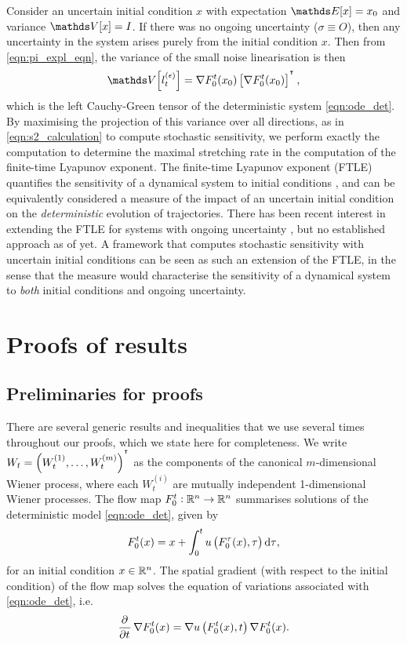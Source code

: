 Consider an uncertain initial condition \(x\) with expectation \(\avg{x} = x_0\) and variance \(\var{x} = I\).
If there was no ongoing uncertainty (\(\sigma \equiv O\)), then any uncertainty in the system arises purely from the initial condition \(x\).
Then from \cref{eqn:pi_expl_eqn}, the variance of the small noise linearisation is then
\[
	\var{l_t^{(\epsilon)}} = \nabla F_0^t\!\left(x_0\right)\left[\nabla F_0^t\!\left(x_0\right)\right]^{\T},
\]
which is the left Cauchy-Green tensor of the deterministic system \cref{eqn:ode_det}.
By maximising the projection of this variance over all directions, as in \cref{eqn:s2_calculation} to compute stochastic sensitivity, we perform exactly the computation to determine the maximal stretching rate in the computation of the finite-time Lyapunov exponent.
The finite-time Lyapunov exponent (FTLE) quantifies the sensitivity of a dynamical system to initial conditions \citep{ShaddenEtAl_2005_DefinitionPropertiesLagrangian}, and can be equivalently considered a measure of the impact of an uncertain initial condition on the \emph{deterministic} evolution of trajectories.
There has been recent interest in extending the FTLE for systems with ongoing uncertainty \citep{Balasuriya_2020_UncertaintyFinitetimeLyapunov,YouLeung_2021_ComputingFiniteTime,GuoEtAl_2016_FiniteTimeLyapunovExponents}, but no established approach as of yet.
A framework that computes stochastic sensitivity with uncertain initial conditions can be seen as such an extension of the FTLE, in the sense that the measure would characterise the sensitivity of a dynamical system to \emph{both} initial conditions and ongoing uncertainty.




\section{Proofs of results}\label{sec:paper_proofs}
\subsection{Preliminaries for proofs}\label{app:gauss}

There are several generic results and inequalities that we use several times throughout our proofs, which we state here for completeness.
We write \(W_t = \left(W_t^{(1)}, \hdots, W_t^{(m)}\right)^{^{\intercal}}\) as the components of the canonical \(m\)-dimensional Wiener process, where each \(W_t^{(i)}\) are mutually independent 1-dimensional Wiener processes.
The flow map \(F_0^t: \mathbb{R}^n \to \mathbb{R}^n\) summarises solutions of the deterministic model \cref{eqn:ode_det}, given by
\begin{equation}
	F_{0}^{t}(x) = x + \int_{0}^{t}{u\left(F_{0}^{\tau}(x), \tau\right)\dif \tau},
	\label{eqn:flow_map_int}
\end{equation}
for an initial condition \(x \in \mathbb{R}^n\).
The spatial gradient (with respect to the initial condition) of the flow map solves the equation of variations associated with \cref{eqn:ode_det}, i.e.
\begin{equation}
	\dpd{}{t}\nabla F_0^t(x) = \nabla u\left(F_0^t(x), t\right)\nabla F_0^t(x).
	\label{eqn:eqn_of_vars}
\end{equation}

